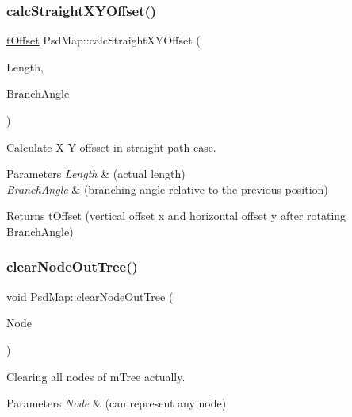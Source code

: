 \subsubsection{\texorpdfstring{calc\+Straight\+X\+Y\+Offset()}{calcStraightXYOffset()}}
{\footnotesize\ttfamily \hyperlink{_psd_message_decoder_8h_a7d8466510c49a8035fcf35b2949bea5a}{t\+Offset} Psd\+Map\+::calc\+Straight\+X\+Y\+Offset (\begin{DoxyParamCaption}\item[{double}]{Length,  }\item[{double}]{Branch\+Angle }\end{DoxyParamCaption})}



Calculate X Y offsset in straight path case. 


\begin{DoxyParams}{Parameters}
{\em Length} & (actual length) \\
\hline
{\em Branch\+Angle} & (branching angle relative to the previous position) \\
\hline
\end{DoxyParams}
\begin{DoxyReturn}{Returns}
t\+Offset (vertical offset x and horizontal offset y after rotating Branch\+Angle) 
\end{DoxyReturn}
\mbox{\label{class_psd_map_a1ed126a63203198d3aeca3ccef1f4577}} 
\subsubsection{\texorpdfstring{clear\+Node\+Out\+Tree()}{clearNodeOutTree()}}
{\footnotesize\ttfamily void Psd\+Map\+::clear\+Node\+Out\+Tree (\begin{DoxyParamCaption}\item[{struct \hyperlink{struct_tree_node}{Tree\+Node} $\ast$}]{Node }\end{DoxyParamCaption})}



Clearing all nodes of m\+Tree actually. 


\begin{DoxyParams}{Parameters}
{\em Node} & (can represent any node) \\
\hline
\end{DoxyParams}
\mbox{\label{class_psd_map_a4413fa2f7b4dbc83449f184c6b4963cc}} 
